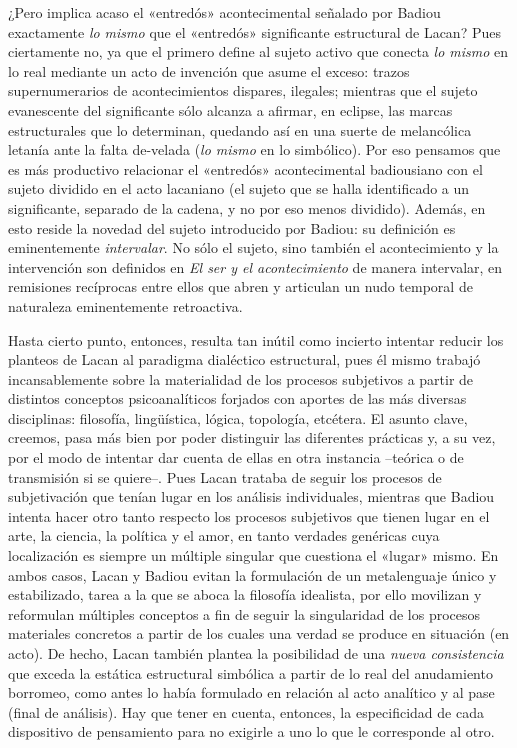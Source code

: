 ¿Pero implica acaso el «entredós» acontecimental señalado por Badiou exactamente \emph{lo mismo} que el «entredós» significante estructural de Lacan? Pues ciertamente no, ya que el primero define al sujeto activo que conecta \emph{lo mismo} en lo real mediante un acto de invención que asume el exceso: trazos supernumerarios de acontecimientos dispares, ilegales; mientras que el sujeto evanescente del significante sólo alcanza a afirmar, en eclipse, las marcas estructurales que lo determinan, quedando así en una suerte de melancólica letanía ante la falta de-velada (\emph{lo mismo} en lo simbólico). Por eso pensamos que es más productivo relacionar el «entredós» acontecimental badiousiano con el sujeto dividido en el acto lacaniano (el sujeto que se halla identificado a un significante, separado de la cadena, y no por eso menos dividido). Además, en esto reside la novedad del sujeto introducido por Badiou: su definición es eminentemente \emph{intervalar}. No sólo el sujeto, sino también el acontecimiento y la intervención son definidos en \emph{El ser y el acontecimiento }de manera intervalar, en remisiones recíprocas entre ellos que abren y articulan un nudo temporal de naturaleza eminentemente retroactiva.

Hasta cierto punto, entonces, resulta tan inútil como incierto intentar reducir los planteos de Lacan al paradigma dialéctico estructural, pues él mismo trabajó incansablemente sobre la materialidad de los procesos subjetivos a partir de distintos conceptos psicoanalíticos forjados con aportes de las más diversas disciplinas: filosofía, lingüística, lógica, topología, etcétera. El asunto clave, creemos, pasa más bien por poder distinguir las diferentes prácticas y, a su vez, por el modo de intentar dar cuenta de ellas en otra instancia --teórica o de transmisión si se quiere--. Pues Lacan trataba de seguir los procesos de subjetivación que tenían lugar en los análisis individuales, mientras que Badiou intenta hacer otro tanto respecto los procesos subjetivos que tienen lugar en el arte, la ciencia, la política y el amor, en tanto verdades genéricas cuya localización es siempre un múltiple singular que cuestiona el «lugar» mismo. En ambos casos, Lacan y Badiou evitan la formulación de un metalenguaje único y estabilizado, tarea a la que se aboca la filosofía idealista, por ello movilizan y reformulan múltiples conceptos a fin de seguir la singularidad de los procesos materiales concretos a partir de los cuales una verdad se produce en situación (en acto). De hecho, Lacan también plantea la posibilidad de una \emph{nueva consistencia} que exceda la estática estructural simbólica a partir de lo real del anudamiento borromeo, como antes lo había formulado en relación al acto analítico y al pase (final de análisis). Hay que tener en cuenta, entonces, la especificidad de cada dispositivo de pensamiento para no exigirle a uno lo que le corresponde al otro.


